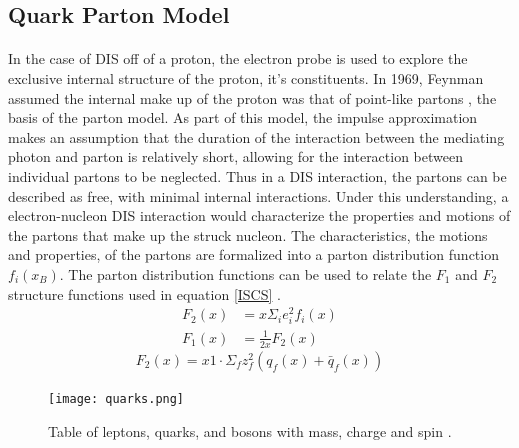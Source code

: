 \subsection{Quark Parton Model}
\paragraph{}In the case of DIS off of a proton, the electron probe is used to explore the exclusive internal structure of the proton, it's constituents. In 1969, Feynman assumed the internal make up of the proton was that of point-like partons \cite{Briskin_thesis,DISproton}, the basis of the parton model. As part of this model, the impulse approximation makes an assumption that the duration of the interaction between the mediating photon and parton is relatively short, allowing for the interaction between individual partons to be neglected. Thus in a DIS interaction, the partons can be described as free, with minimal internal interactions. Under this understanding, a electron-nucleon DIS interaction would characterize the properties and motions of the partons that make up the struck nucleon\cite{DISproton}. The characteristics, the motions and properties, of the partons are formalized into a parton distribution function $f_i(x_B)$.  The parton distribution functions can be used to relate the $F_1$ and $F_2$ structure functions used in equation \ref{ISCS} \cite{PnN}. 
\begin{align}
	\label{PDFs}
	F_2(x) &= x \Sigma_i e^2_i f_i(x)\\
	F_1(x) &= \frac{1}{2x} F_2(x) \nonumber
\end{align}
\begin{equation}
\label{F2q}
F_2(x) = x1 \cdot \Sigma_f z^2_f ( q_f(x) + \bar{q}_f(x))
\end{equation}
\paragraph{}
\cite{DISearly,DISproton,whitlow_sigma,Q2indy}


\begin{figure}[]
	\centering
	\texttt{[image: quarks.png]} 
	\caption{ Table of leptons, quarks, and bosons with mass, charge and spin \cite{sane}.}
	\label{fig:quarks}
\end{figure} 

	
	
